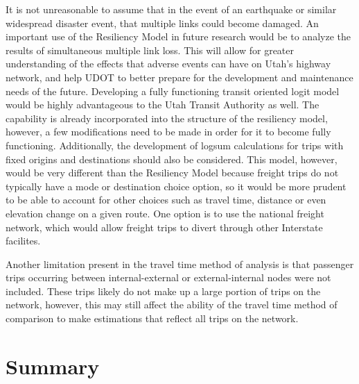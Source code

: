 It is not unreasonable to assume that in the event of an earthquake or
similar widespread disaster event, that multiple links could become
damaged. An important use of the Resiliency Model in future research would be
to analyze the results of simultaneous multiple link
loss. This will allow for
greater understanding of the effects that adverse events can have on Utah’s
highway network, and help UDOT to better prepare for the development and
maintenance needs of the future. Developing a fully functioning transit oriented logit model
would be highly advantageous to the Utah Transit Authority as well. The capability
is already incorporated into the structure of the resiliency model, however, a few modifications
need to be made in order for it to become fully functioning.
Additionally, the development of logsum calculations for trips with fixed
origins and destinations should also be considered. This model, however,
would be very different than the Resiliency Model because freight trips
do not typically have a mode or destination choice option, so it would be
more prudent to be able to account for other choices such as travel time,
distance or even elevation change on a given route. One option is to use the national
freight network, which would allow freight trips to divert through other Interstate
facilites.

Another limitation present in the travel time method of analysis is that passenger
trips occurring between internal-external or external-internal nodes were not
included. These trips likely do not make up a large portion of trips on the network,
however, this may still affect the ability of the travel time method of comparison
to make estimations that reflect all trips on the network.

\section{Summary}


